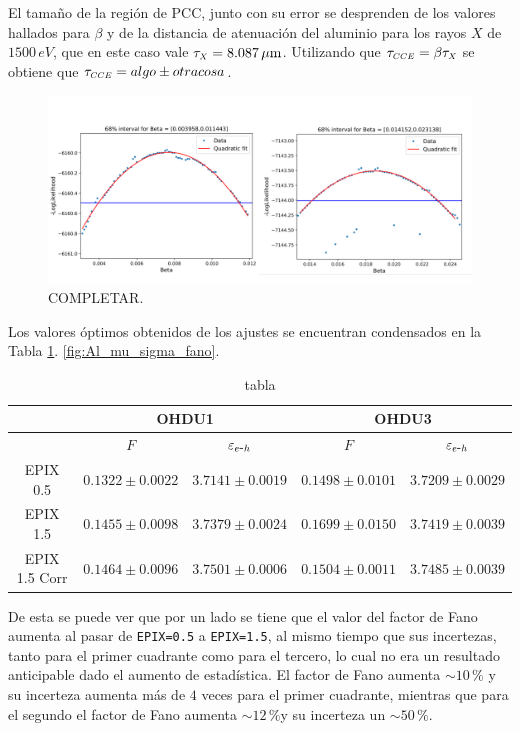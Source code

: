 El tamaño de la región de PCC, junto con su error se desprenden de los valores hallados para $\beta$ y de la distancia de atenuación del aluminio para los rayos $X$ de $1500\,\si{eV}$, que en este caso vale $\tau_{\scaleto{X}{4pt}} = 8.087\,\si{\mu m}$\cite{AttenuationLength}. Utilizando que $\tau_{\scaleto{CCE}{4pt}} = \beta \tau_{\scaleto{X}{4pt}}$ se obtiene que $\tau_{\scaleto{CCE}{4pt}} = algo \pm otra cosa$.

\begin{figure}[h]
    \centering
        \includegraphics[scale=0.25]{pngs/Al_barridos_beta.png}
    \caption{\footnotesize{COMPLETAR.}}
    \label{fig:Al_barridos_beta}
\end{figure}
Los valores óptimos obtenidos de los ajustes se encuentran condensados en la Tabla \ref{tab:Al_FanoEehOHDU1y3}.
\ref{fig:Al_mu_sigma_fano}.
\begin{table}[h]
\centering
\begin{tabular}{@{}ccccc@{}}
\toprule
                & \multicolumn{2}{c}{OHDU1}                 & \multicolumn{2}{c}{OHDU3}                 \\ \hline\hline
                & $F$                 & $\varepsilon_{e\mbox{-}h}$ & $F$                 & $\varepsilon_{e\mbox{-}h}$ \\
EPIX 0.5 & $0.1322 \pm 0.0022$ & $3.7141 \pm 0.0019$ & $0.1498 \pm 0.0101$ & $3.7209 \pm 0.0029$ \\ 
EPIX 1.5 & $0.1455 \pm 0.0098$ & $3.7379 \pm 0.0024$ & $0.1699 \pm 0.0150$ & $3.7419 \pm 0.0039$ \\ 
EPIX 1.5 Corr & $0.1464 \pm 0.0096$ & $3.7501 \pm 0.0006$ & $0.1504 \pm 0.0011$ & $3.7485 \pm 0.0039$ \\ \bottomrule \hline
\end{tabular}
\caption{tabla}
\label{tab:Al_FanoEehOHDU1y3}
\end{table}
De esta se puede ver que por un lado se tiene que el valor del factor de Fano aumenta al pasar de \verb|EPIX=0.5| a \verb|EPIX=1.5|, al mismo tiempo que sus incertezas, tanto para el primer cuadrante como para el tercero, lo cual no era un resultado anticipable dado el aumento de estadística. El factor de Fano aumenta $\sim 10\,\%$ y su incerteza aumenta más de $4$ veces para el primer cuadrante, mientras que para el segundo el factor de Fano aumenta $\sim 12\,\%$y su incerteza un $\sim 50\,\%$.

